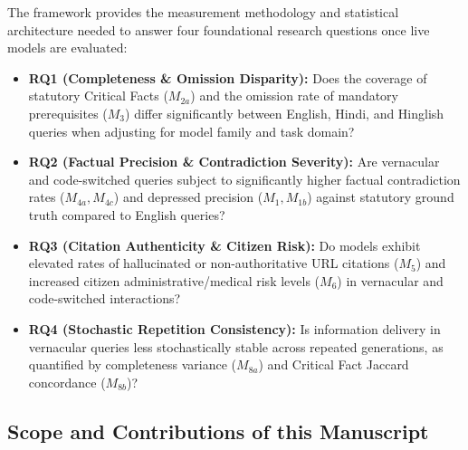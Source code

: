 \documentclass[11pt,a4paper]{article}
\begin{document}
The framework provides the measurement methodology and statistical architecture needed to answer four foundational research questions once live models are evaluated:
\begin{itemize}
  \item \textbf{RQ1 (Completeness \& Omission Disparity):} Does the coverage of statutory Critical Facts ($M_{2a}$) and the omission rate of mandatory prerequisites ($M_3$) differ significantly between English, Hindi, and Hinglish queries when adjusting for model family and task domain?
  \item \textbf{RQ2 (Factual Precision \& Contradiction Severity):} Are vernacular and code-switched queries subject to significantly higher factual contradiction rates ($M_{4a}, M_{4c}$) and depressed precision ($M_1, M_{1b}$) against statutory ground truth compared to English queries?
  \item \textbf{RQ3 (Citation Authenticity \& Citizen Risk):} Do models exhibit elevated rates of hallucinated or non-authoritative URL citations ($M_5$) and increased citizen administrative/medical risk levels ($M_6$) in vernacular and code-switched interactions?
  \item \textbf{RQ4 (Stochastic Repetition Consistency):} Is information delivery in vernacular queries less stochastically stable across repeated generations, as quantified by completeness variance ($M_{8a}$) and Critical Fact Jaccard concordance ($M_{8b}$)?
\end{itemize}

\subsection{Scope and Contributions of this Manuscript}
\label{sec:contributions}
\end{document}
